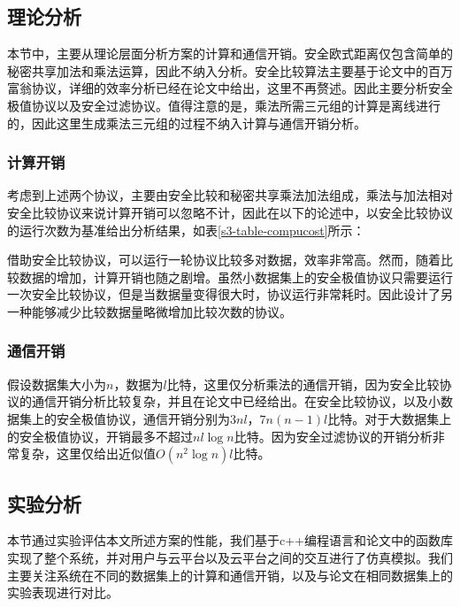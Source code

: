 \subsection{理论分析}
本节中，主要从理论层面分析方案的计算和通信开销。安全欧式距离仅包含简单的秘密共享加法和乘法运算，因此不纳入分析。安全比较算法主要基于论文\cite{rathee2020cryptflow2}中的百万富翁协议，详细的效率分析已经在论文中给出，这里不再赘述。因此主要分析安全极值协议以及安全过滤协议。值得注意的是，乘法所需三元组的计算是离线进行的，因此这里生成乘法三元组的过程不纳入计算与通信开销分析。
\subsubsection{计算开销}
考虑到上述两个协议，主要由安全比较和秘密共享乘法加法组成，乘法与加法相对安全比较协议来说计算开销可以忽略不计，因此在以下的论述中，以安全比较协议的运行次数为基准给出分析结果，如表\ref{s3-table-compucost}所示：
\begin{table}[htbp]
	\centering
	\renewcommand{\arraystretch}{1.3}
	\caption{计算开销}
	\label{s3-table-compucost}
\end{table}

借助安全比较协议，可以运行一轮协议比较多对数据，效率非常高。然而，随着比较数据的增加，计算开销也随之剧增。虽然小数据集上的安全极值协议只需要运行一次安全比较协议，但是当数据量变得很大时，协议运行非常耗时。因此设计了另一种能够减少比较数据量略微增加比较次数的协议。

\subsubsection{通信开销}
假设数据集大小为$ n $，数据为$ l$比特，这里仅分析乘法的通信开销，因为安全比较协议的通信开销分析比较复杂，并且在论文\cite{rathee2020cryptflow2}中已经给出。在安全比较协议，以及小数据集上的安全极值协议，通信开销分别为$ 3nl $，$ 7n(n-1)l $比特。对于大数据集上的安全极值协议，开销最多不超过$ nl\log n $比特。因为安全过滤协议的开销分析非常复杂，这里仅给出近似值$ O(n^2\log n)l $比特。
\subsection{实验分析}
本节通过实验评估本文所述方案的性能，我们基于c++编程语言和论文\cite{rathee2020cryptflow2}中的函数库实现了整个系统，并对用户与云平台以及云平台之间的交互进行了仿真模拟。我们主要关注系统在不同的数据集上的计算和通信开销，以及与论文\cite{wu2020secure,mohassel2019practical,jaschke2019unsupervised}在相同数据集上的实验表现进行对比。

